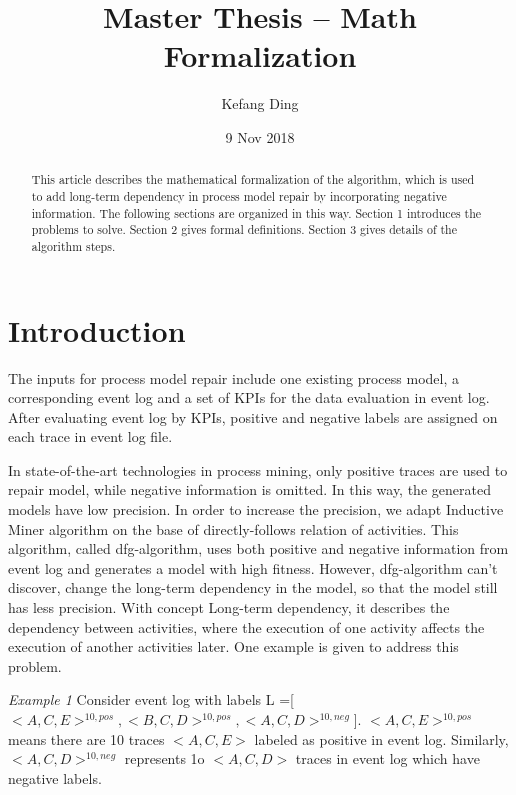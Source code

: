 \documentclass[]{article}
\title{Master Thesis --  Math Formalization}
\author{Kefang Ding}
\date{9 Nov 2018}
\begin{document}
\maketitle

\hrulefill
\hrulefill 

\begin{abstract}
This article describes the mathematical formalization of the algorithm, which is used to add long-term dependency in process model repair by incorporating negative information. The following sections are organized in this way. Section 1 introduces the problems to solve. Section 2 gives formal definitions. Section 3 gives details of the algorithm steps. 
\end{abstract}

\section{Introduction}
The inputs for process model repair include one existing process model, a corresponding event log and a set of KPIs for the data evaluation in event log. After evaluating event log by KPIs, positive and negative labels are assigned on each trace in event log file. 

In state-of-the-art technologies in process mining, only positive traces are used to repair model, while negative information is omitted. In this way, the generated models have low precision. In order to increase the precision, we adapt Inductive Miner algorithm on the base of directly-follows relation of activities. This algorithm, called dfg-algorithm, uses both positive and negative information from event log and generates a model with high fitness. However, dfg-algorithm can't discover, change the long-term dependency in the model, so that the model still has less precision. With concept Long-term dependency, it describes the dependency between activities, where the execution of one activity affects the execution of another activities later. One example is given to address this problem.

\textit{Example 1} Consider event log with labels L =[$<A,C,E>^{10,pos}, <B,C,D>^{10,pos}, <A,C,D>^{10,neg}$]. $<A,C,E>^{10,pos}$ means there are 10 traces $<A,C,E>$ labeled as positive in event log. Similarly, $<A,C,D>^{10,neg}$ represents 1o $<A,C,D>$ traces in event log which have negative labels. 
\end{document}
